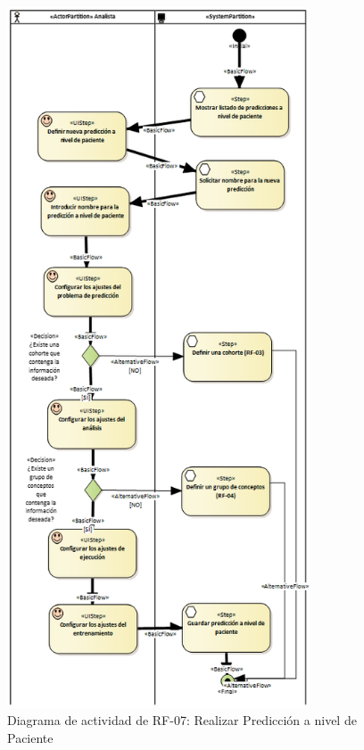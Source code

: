 \begin{figure}[H]
    \centering
    \includegraphics[width=0.80\textwidth]{figures/FR07.png}
    \caption{Diagrama de actividad de RF-07: Realizar Predicción a nivel de Paciente}
    \label{fig:FR07}
\end{figure}

